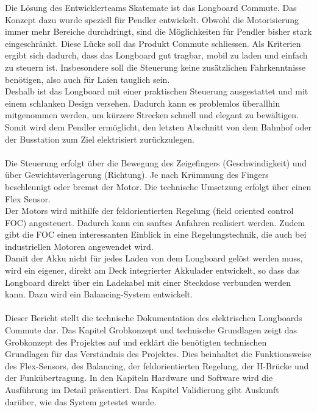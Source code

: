 Die Lösung des Entwicklerteams Skatemate ist das Longboard Commute. Das Konzept dazu wurde speziell für Pendler entwickelt. 
Obwohl die Motorisierung immer mehr Bereiche durchdringt, sind die Möglichkeiten für Pendler bisher stark eingeschränkt. Diese Lücke soll das Produkt Commute schliessen.
Als Kriterien ergibt sich dadurch, dass das Longboard gut tragbar, mobil zu laden und einfach zu steuern ist. Insbesondere soll die Steuerung keine zusätzlichen Fahrkenntnisse benötigen, also auch für Laien tauglich sein.\\
Deshalb ist das Longboard mit einer praktischen Steuerung ausgestattet und mit einem schlanken Design versehen. Dadurch kann es problemlos überallhin mitgenommen werden, um kürzere Strecken schnell und elegant zu bewältigen. Somit wird dem Pendler ermöglicht, den letzten Abschnitt von dem Bahnhof oder der Busstation zum Ziel elektrisiert zurückzulegen. 
\\ \\
Die Steuerung erfolgt über die Bewegung des Zeigefingers (Geschwindigkeit) und über Gewichtsverlagerung (Richtung). Je nach Krümmung des Fingers beschleunigt oder bremst der Motor. Die technische Umsetzung erfolgt über einen Flex Sensor. \\
Der Motors wird mithilfe der feldorientierten Regelung (field oriented control FOC) angesteuert. Dadurch kann ein sanftes Anfahren realisiert werden. Zudem gibt die FOC einen interessanten Einblick in eine Regelungstechnik, die auch bei industriellen Motoren angewendet wird. \\
Damit der Akku nicht für jedes Laden von dem Longboard gelöst werden muss, wird ein eigener, direkt am Deck integrierter Akkulader entwickelt, so dass das Longboard direkt über ein Ladekabel mit einer Steckdose verbunden werden kann. Dazu wird ein Balancing-System entwickelt.
\\\\
Dieser Bericht stellt die technische Dokumentation des elektrischen Longboards Commute dar. Das Kapitel Grobkonzept und technische Grundlagen zeigt das Grobkonzept des Projektes auf und erklärt die benötigten technischen Grundlagen für das Verständnis des Projektes. Dies beinhaltet die Funktionsweise des Flex-Sensors, des Balancing, der feldorientierten Regelung, der H-Brücke und der Funkübertragung. In den Kapiteln Hardware und Software wird die Ausführung im Detail präsentiert. Das Kapitel Validierung gibt Auskunft darüber, wie das System getestet wurde. 
